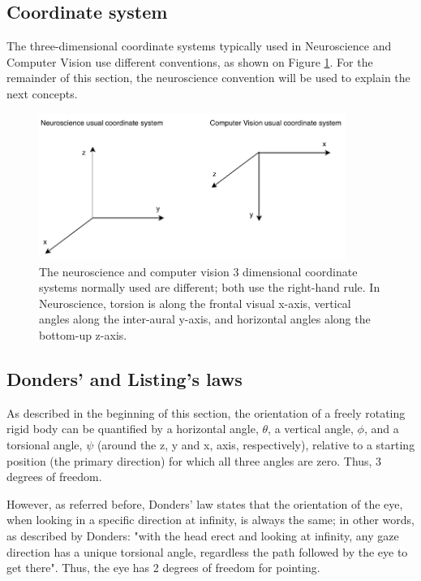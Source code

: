 \subsection{Coordinate system}
The three-dimensional coordinate systems typically used in Neuroscience and Computer Vision use different conventions, as shown on Figure \ref{sec2:fig:coordsys}. For the remainder of this section, the 
neuroscience convention will be used to explain the next concepts.
\begin{figure}[ht]
	\centering
	\includegraphics[width=10cm]{images/coordsys.pdf}
	\caption[Neuroscience vs Computer vision usual coordinate systems]{The neuroscience and computer vision 3 dimensional coordinate systems normally used are different; both use the right-hand rule. In Neuroscience, torsion is along the frontal visual x-axis, vertical angles along the inter-aural y-axis, and horizontal angles along the bottom-up z-axis.}
	\label{sec2:fig:coordsys}
\end{figure}

\subsection{Donders' and Listing's laws}

As described in the beginning of this section, the orientation of a freely rotating rigid body can be quantified by a horizontal angle, $\theta$, a vertical angle, $\phi$,  and a torsional angle, $\psi$ (around the z, y and x, axis, respectively), relative to a starting position (the primary direction) for which all three angles are zero. Thus, 3 degrees of freedom.

However, as referred before, Donders' law states that the orientation of the eye, when looking in a specific direction at infinity, is always the same; in other words, as described by Donders: 
"with the head erect and looking at infinity, any gaze direction has a unique torsional angle, regardless the path followed by the eye to get there". Thus, the eye has 2 degrees of freedom for pointing.

